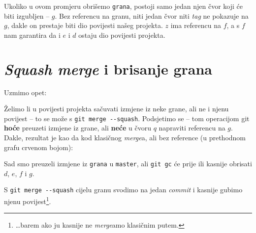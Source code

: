 

Ukoliko u ovom promjeru obrišemo \verb+grana+, postoji samo jedan njen čvor koji će biti izgubljen -- $g$.
Bez referencu na granu, niti jedan čvor niti \emph{tag} ne pokazuje na $g$, dakle on prestaje biti dio povijesti našeg projekta.
$z$ ima referencu na $f$, a s $f$ nam garantira da i $e$ i $d$ ostaju dio povijesti projekta.

\section*{\emph{Squash merge} i brisanje grana}

Uzmimo opet:



Želimo li u povijesti projekta sačuvati izmjene iz neke grane, ali ne i njenu povijest -- to se može s \verb+git merge --squash+.
Podsjetimo se -- tom operacijom git \textbf{hoće} preuzeti izmjene iz grane, ali \textbf{neće} u čvoru $q$ napraviti referencu na $g$.
Dakle, rezultat je kao da kod klasičnog \emph{merge}a, ali bez reference (u prethodnom grafu crvenom bojom):



Sad smo preuzeli izmjene iz \verb+grana+ u \verb+master+, ali \verb+git gc+ će prije ili kasnije obrisati $d$, $e$, $f$ i $g$.

S \verb+git merge --squash+ cijelu granu svodimo na jedan \emph{commit} i kasnije gubimo njenu povijest\footnote{\dots{}barem ako ju kasnije ne \emph{merge}amo klasičnim putem.}.
